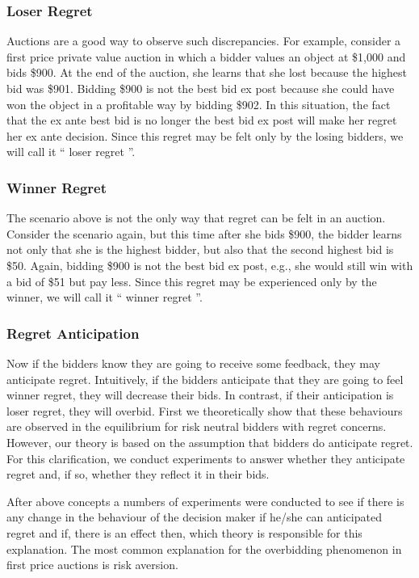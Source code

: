 \documentclass[10pt,a4paper,oneside]{report}
\begin{document}
\subsubsection{Loser Regret}
Auctions are a good way to observe such discrepancies. For example, consider a first price private value auction in which a bidder values an object at \$1,000 and bids \$900. At the end of the auction, she learns that she lost because the highest bid was \$901. Bidding \$900 is not the best bid ex post because she could have won the
object in a profitable way by bidding \$902. In this situation, the fact that the ex ante best bid is no longer the best bid ex post will make her regret her ex ante decision. Since this regret may be felt only by the losing bidders, we will call it “ loser regret ”.

\subsubsection{Winner Regret}
The scenario above is not the only way that regret can be felt in an auction. Consider the scenario again, but this time after she bids \$900, the bidder learns not only that she is the highest bidder, but also that the second highest bid is \$50. Again, bidding \$900 is not the best bid ex post, e.g., she would still win with a bid of \$51 but pay less. Since this regret may be experienced only by the winner, we will call it “ winner regret ”.

\subsubsection{Regret Anticipation }
Now if the bidders know they are going to receive some feedback, they may anticipate regret. Intuitively, if the bidders anticipate that they are going to feel winner regret, they will decrease their bids. In contrast, if their anticipation is loser regret, they will overbid. First we theoretically show that these behaviours are observed in the equilibrium for risk neutral bidders with regret concerns. However, our theory is based on the assumption
that bidders do anticipate regret. For this clarification, we conduct experiments to answer whether they anticipate regret and, if so, whether they reflect it in their bids.

After above concepts a numbers of experiments were conducted to see if there is any change in the behaviour of the decision maker if he/she can anticipated regret and if, there is an effect then, which theory is responsible for this explanation. The most common explanation for the overbidding phenomenon in first price auctions is
risk aversion.
\end{document}
